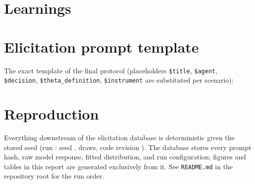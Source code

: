 \documentclass[11pt]{article}
\begin{document}
\section{Learnings}
\label{sec:learnings}



\appendix

\section{Elicitation prompt template}
\label{app:prompt}

The exact template of the final protocol (placeholders \texttt{\$title},
\texttt{\$agent}, \texttt{\$decision}, \texttt{\$theta\_definition},
\texttt{\$instrument} are substituted per scenario):



\section{Reproduction}
\label{app:repro}

Everything downstream of the elicitation database is deterministic given the
stored seed (run \voiRunId: seed \voiSeed, \voiNDraws{} draws, code revision
\texttt{\voiCodeHash}). The database stores every prompt hash, raw model
response, fitted distribution, and run configuration; figures and tables in
this report are generated exclusively from it. See \texttt{README.md} in the
repository root for the run order.
\end{document}
